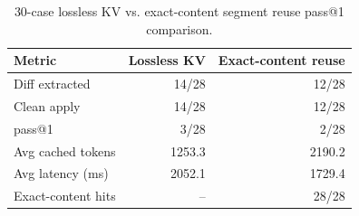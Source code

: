 \begin{table}[t]
\centering
\caption{30-case lossless KV vs. exact-content segment reuse pass@1 comparison.}
\label{tab:passrate}
\begin{tabular}{lrr}
\toprule
Metric & Lossless KV & Exact-content reuse \\
\midrule
Diff extracted & 14/28 & 12/28 \\
Clean apply & 14/28 & 12/28 \\
pass@1 & 3/28 & 2/28 \\
Avg cached tokens & 1253.3 & 2190.2 \\
Avg latency (ms) & 2052.1 & 1729.4 \\
Exact-content hits & -- & 28/28 \\
\bottomrule
\end{tabular}
\end{table}
